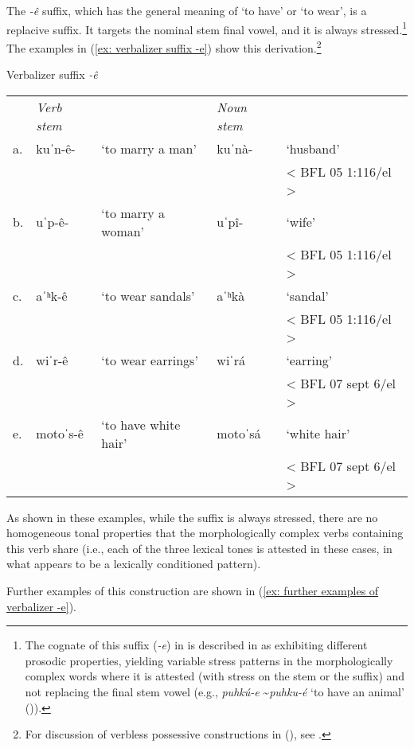 The \textit{-ê} suffix, which has the general meaning of ‘to have’ or ‘to wear’, is a replacive suffix. It targets the nominal stem final vowel, and it is always stressed.\footnote{The cognate of this suffix (\textit{-e}) in  is described in \citet{miller1996guarijio} as exhibiting different prosodic properties, yielding variable stress patterns in the morphologically complex words where it is attested (with stress on the stem or the suffix) and not replacing the final stem vowel (e.g., \textit{puhkú-e} \textasciitilde \textit{puhku-é} `to have an animal' (\citeyear[149]{miller1996guarijio})).} The examples in (\ref{ex: verbalizer suffix -e}) show this derivation.\footnote{For discussion of verbless possessive constructions in  (), see \citet{jelinek1988verbless}.}


\ea\label{ex: verbalizer suffix -e}
{Verbalizer suffix \textit{-ê}}
\setlength{\tabcolsep}{4pt}
\begin{tabular}{lllll}
    & \textit{Verb stem} & & \textit{Noun stem} & \\
     a. &  {kuˈn-ê-} & {‘to marry a man’}& {kuˈnà-} & {`husband'}\\
    & & & & {< BFL 05 1:116/el >}\\
     b. & {uˈp-ê-}&{‘to marry a woman’}& {uˈpî-} & {‘wife’}\\
     & & &   & {< BFL 05 1:116/el >}\\
     c. & aˈʰk-ê & `to wear sandals' & {aˈʰkà}& {‘sandal'}\\
         & & &  &   {< BFL 05 1:116/el >}\\
     d. & {wiˈr-ê} & {‘to wear earrings’}&{wiˈrá} &  {‘earring’}\\
            & & & &     {< BFL 07 sept 6/el >}\\
     e. & {motoˈs-ê}&{‘to have white hair’}&{motoˈsá} & { ‘white hair’}\\
          & & & & {< BFL 07 sept 6/el >}\\
\end{tabular}
\z

As shown in these examples, while the suffix is always stressed, there are no homogeneous tonal properties that the morphologically complex verbs containing this verb share (i.e., each of the three lexical tones is attested in these cases, in what appears to be a lexically conditioned pattern).

Further examples of this construction are shown in (\ref{ex: further examples of verbalizer -e}).

